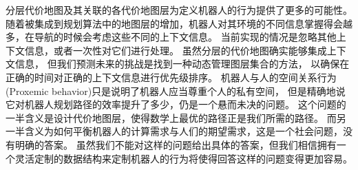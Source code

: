 分层代价地图及其关联的各代价地图层为定义机器人的行为提供了更多的可能性。
随着被集成到规划算法中的地图层的增加，机器人对其环境的不同信息掌握得会越多，在导航的时候会考虑这些不同的上下文信息。
当前实现的情况是忽略其他上下文信息，或者一次性对它们进行处理。
虽然分层的代价地图确实能够集成上下文信息，
但我们预测未来的挑战是找到一种动态管理图层集合的方法，
以确保在正确的时间对正确的上下文信息进行优先级排序。 
机器人与人的空间关系行为(Proxemic behavior)只是说明了机器人应当尊重个人的私有空间，
但是精确地说它对机器人规划路径的效率提升了多少，仍是一个悬而未决的问题。
这个问题的一半含义是设计代价地图层，使得数学上最优的路径正是我们所需的路径。
而另一半含义为如何平衡机器人的计算需求与人们的期望需求，这是一个社会问题，没有明确的答案。
虽然我们不能对这样的问题给出具体的答案，但我们相信拥有一个灵活定制的数据结构来定制机器人的行为将使得回答这样的问题变得更加容易。
